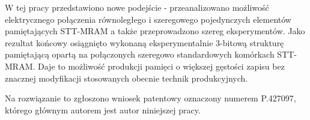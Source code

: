     W tej pracy przedstawiono nowe podejście - przeanalizowano możliwość elektrycznego połączenia równoległego i szeregowego pojedynczych elementów pamiętających STT-MRAM a także przeprowadzono szereg eksperymentów. Jako rezultat końcowy osiągnięto wykonaną eksperymentalnie 3-bitową strukturę pamiętającą opartą na połączonych szeregowo standardowych komórkach STT-MRAM. Daje to możliwość produkcji pamięci o większej gęstości zapisu bez znacznej modyfikacji stosowanych obecnie technik produkcyjnych.
    
    Na rozwiązanie to zgłoszono wniosek patentowy oznaczony numerem P.427097, którego głównym autorem jest autor niniejszej pracy.